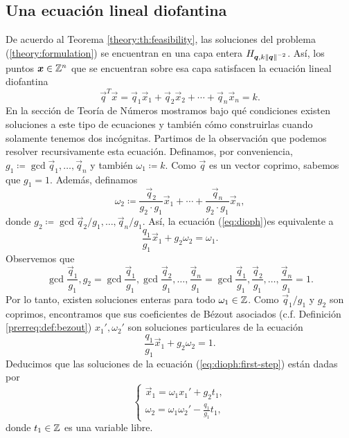\subsection{Una ecuación lineal diofantina}
\noindent
De acuerdo al Teorema \ref{theory:th:feasibility}, las soluciones del problema
(\ref{theory:formulation}) se encuentran en una capa entera $H_{\boldsymbol{q}, k\left\lVert \boldsymbol{q} \right\rVert^{-2}}$.
Así, los puntos $\boldsymbol{x} \in \mathbb{Z}^n$ que se encuentran sobre esa capa satisfacen la ecuación lineal
diofantina
\begin{equation}
	\label{eq:dioph}
	\vec{q}^T\vec{x} = \vec{q}_1\vec{x}_1 + \vec{q}_2\vec{x}_2 + \cdots + \vec{q}_n\vec{x}_n = k.
\end{equation}
En la sección de Teoría de Números mostramos bajo qué condiciones existen soluciones a este tipo de
ecuaciones y también cómo construirlas cuando solamente tenemos dos incógnitas. Partimos de la
observación que podemos resolver recursivamente esta ecuación. Definamos, por conveniencia,
$g_1 \coloneq \gcd{\vec{q}_1, \ldots, \vec{q}_n}$ y también $\omega_1 \coloneq k$. Como
$\vec{q}$ es un vector coprimo, sabemos que $g_1 = 1$. Además, definamos
\begin{equation*}
	\omega_2 \coloneq \frac{\vec{q}_2}{g_2 \cdot g_1}\vec{x}_1 + \cdots + \frac{\vec{q}_n}{g_2 \cdot
	g_1}\vec{x}_n,
\end{equation*}
donde $g_2 \coloneq \gcd{\vec{q}_2/g_1, \ldots, \vec{q}_n/g_1}$. Así, la ecuación (\ref{eq:dioph})es
equivalente a
\begin{equation}
	\label{eq:dioph:first-step}
	\frac{q_1}{g_1}\vec{x}_1 + g_2\omega_2 = \omega_1.
\end{equation}
Observemos que
\begin{equation*}
	\gcd{\frac{\vec{q}_1}{g_1}, g_2}
	= \gcd{\frac{\vec{q}_1}{g_1}, \gcd{\frac{\vec{q}_2}{g_1}, \ldots, \frac{\vec{q}_n}{g_1}}}
	= \gcd{\frac{\vec{q}_1}{g_1}, \frac{\vec{q}_2}{g_1}, \ldots, \frac{\vec{q}_n}{g_1}} = 1.
\end{equation*}
Por lo tanto, existen soluciones enteras para todo $\omega_1 \in \mathbb{Z}$. Como $\vec{q}_1/g_1$ y $g_2$
son coprimos, encontramos que sus coeficientes de Bézout asociados (c.f. Definición
\ref{prerreq:def:bezout}) $x_1', \omega_2'$ son soluciones particulares de la ecuación
\begin{equation*}
	\frac{q_1}{g_1}\vec{x}_1 + g_2\omega_2 = 1.
\end{equation*}
Deducimos que las soluciones de la ecuación (\ref{eq:dioph:first-step}) están dadas por
\begin{equation*}
	\begin{cases}
		\vec{x}_1 = \omega_1x_1' + g_2t_1, \\
		\omega_2 = \omega_1\omega_2' - \frac{q_1}{g_1}t_1,
	\end{cases}
\end{equation*}
donde $t_1 \in \mathbb{Z}$ es una variable libre.

